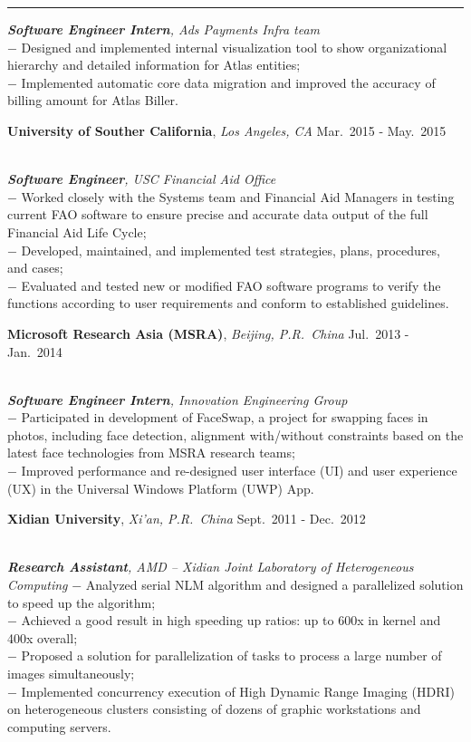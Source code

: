 \documentclass[a4paper,10pt]{article}
\newcommand{\shadedsection}[1]{
    \setlength{\fboxsep}{0pt}
    \colorbox{shadecolor}{%
        \begin{minipage}{\linewidth}%
            \vspace{0.2em}%
            #1%
        \end{minipage}%
    }
}
\newenvironment{rSection}[1]{ %
  \medskip
  \hspace{-1.5em}{\color{Blue}\MakeUppercase{\large \bf {#1}}} %
  \vspace{-0.2em}
  \medskip
  \hrule %
  \begin{list}{}{ %
    \setlength{\leftmargin}{1.5em} %
  }
\setlength{\itemsep}{1pt}
  \item[]
}{
  \end{list}
}
\newcommand{\detail}[1]{{$-$ {#1}}}
\newcommand{\period}[3]{\normalsize {#1} \hfill {#2} - {#3}}
\begin{document}
\begin{rSection}{Experience}
    {\em {\bf Software Engineer Intern}, Ads Payments Infra team}\\
    \detail{Designed and implemented internal visualization tool to show organizational hierarchy and detailed information for Atlas entities;}\\
    \detail{Implemented automatic core data migration and improved the accuracy of billing amount for Atlas Biller.}
  \item
    \shadedsection{\period{{\bf University of Souther California}, {\em Los Angeles, CA}}{Mar.~2015}{May.~2015}}\\
    {\em {\bf Software Engineer}, USC Financial Aid Office}\\
    \detail{Worked closely with the Systems team and Financial Aid Managers in testing current FAO software to ensure precise and accurate data output of the full Financial Aid Life Cycle;}\\
    \detail{Developed, maintained, and implemented test strategies, plans, procedures, and cases;}\\
    \detail{Evaluated and tested new or modified FAO software programs to verify the functions according to user requirements and conform to established guidelines.}
  \item
    \shadedsection{\period{{\bf Microsoft Research Asia (MSRA)}, {\em Beijing, P.R.~China}}{Jul.~2013}{Jan.~2014}}\\
    {\em {\bf Software Engineer Intern}, Innovation Engineering Group}\\
    \detail{Participated in development of FaceSwap, a project for swapping faces in photos, including face detection, alignment with/without constraints based on the latest face technologies from MSRA research teams;}\\
    \detail{Improved performance and re-designed user interface (UI) and user experience (UX) in the Universal Windows Platform (UWP) App.}
  \item
    \shadedsection{\period{{\bf Xidian University}, {\em Xi'an, P.R.~China}}{Sept.~2011}{Dec.~2012}}\\
    {\em {\bf Research Assistant}, AMD -- Xidian Joint Laboratory of Heterogeneous Computing}
    \detail{Analyzed serial NLM algorithm and designed a parallelized solution to speed up the algorithm;}\\
    \detail{Achieved a good result in high speeding up ratios: up to 600x in kernel and 400x overall;}\\
    \detail{Proposed a solution for parallelization of tasks to process a large number of images simultaneously;}\\
    \detail{Implemented concurrency execution of High Dynamic Range Imaging (HDRI) on heterogeneous clusters consisting of dozens of graphic workstations and computing servers.}
\end{rSection}
\end{document}
